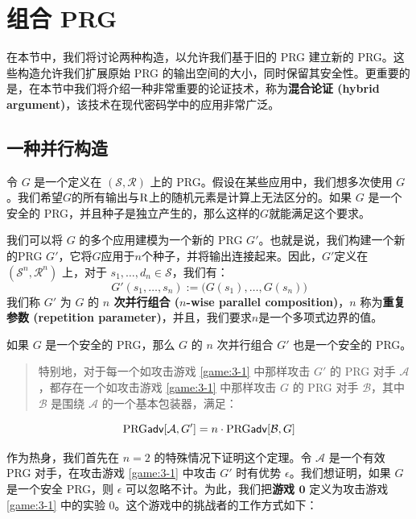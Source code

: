 \section{组合 PRG}

在本节中，我们将讨论两种构造，以允许我们基于旧的 PRG 建立新的 PRG。这些构造允许我们扩展原始 PRG 的输出空间的大小，同时保留其安全性。更重要的是，在本节中我们将介绍一种非常重要的论证技术，称为\textbf{混合论证 (hybrid argument)}，该技术在现代密码学中的应用非常广泛。

\subsection{一种并行构造}\label{subsec:3-4-1}

令 $G$ 是一个定义在 $(\mathcal S,\mathcal R)$ 上的 PRG。假设在某些应用中，我们想多次使用 $G$。我们希望$G$的所有输出与$\mathcal{\rm R}$上的随机元素是计算上无法区分的。如果 $G$ 是一个安全的 PRG，并且种子是独立产生的，那么这样的$G$就能满足这个要求。

我们可以将 $G$ 的多个应用建模为一个新的 PRG $G'$。也就是说，我们构建一个新的PRG $G'$，它将$G$应用于$n$个种子，并将输出连接起来。因此，$G'$定义在 $(\mathcal S^n,\mathcal R^n)$ 上，对于 $s_1,\dots,d_n\in\mathcal S$，我们有：
$$
G'(s_1,\dots,s_n):=\big(G(s_1),\dots,G(s_n)\big)
$$
我们称 $G'$ 为 $G$ 的 \textbf{$n$ 次并行组合 ($n$-wise parallel composition)}，$n$ 称为\textbf{重复参数 (repetition parameter)}，并且，我们要求$n$是一个多项式边界的值。

\begin{theorem}\label{theo:3-2}
如果 $G$ 是一个安全的 PRG，那么 $G$ 的 $n$ 次并行组合 $G'$ 也是一个安全的 PRG。
\begin{quote}
特别地，对于每一个如攻击游戏 \ref{game:3-1} 中那样攻击 $G'$ 的 PRG 对手 $\mathcal A$，都存在一个如攻击游戏 \ref{game:3-1} 中那样攻击 $G$ 的 PRG 对手 $\mathcal B$，其中 $\mathcal B$ 是围绕 $\mathcal A$ 的一个基本包装器，满足：
\end{quote}
$$
{\rm PRG\mathsf{adv}}[\mathcal{A},G']=n\cdot{\rm PRG\mathsf{adv}}[\mathcal{B},G]
$$
\end{theorem}

作为热身，我们首先在 $n=2$ 的特殊情况下证明这个定理。令 $\mathcal A$ 是一个有效 PRG 对手，在攻击游戏 \ref{game:3-1} 中攻击 $G'$ 时有优势 $\epsilon$。我们想证明，如果 $G$ 是一个安全 PRG，则 $\epsilon$ 可以忽略不计。为此，我们把\textbf{游戏 $\mathbf{0}$} 定义为攻击游戏 \ref{game:3-1} 中的实验 $0$。这个游戏中的挑战者的工作方式如下：

\vspace*{5pt}

